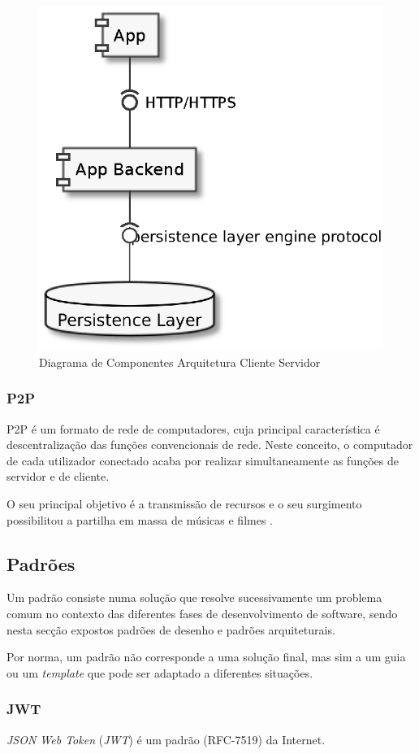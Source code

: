 \begin{figure}[H]
    \begin{center}
    \includegraphics[width=0.5 \textwidth]{figures/actual_web.eps}
    \caption{Diagrama de Componentes Arquitetura Cliente Servidor}
    \end{center}
\end{figure}

\subsubsection{P2P \label{subsection:p2p}}
P2P é um formato de rede de computadores, cuja principal característica é descentralização das funções convencionais de rede. Neste conceito, o computador de cada utilizador conectado acaba por realizar simultaneamente as funções de servidor e de cliente\cite{what_are_P2P_networks}.

O seu principal objetivo é a transmissão de recursos e o seu surgimento possibilitou a partilha em massa de músicas e filmes \cite{what_are_P2P_networks}.

\subsection{Padrões}
Um padrão consiste numa solução que resolve sucessivamente um problema comum no contexto das diferentes fases de desenvolvimento de software, sendo nesta secção expostos padrões de desenho e padrões arquiteturais. 

Por norma, um padrão não corresponde a uma solução final, mas sim a um guia ou um \emph{template} que pode ser adaptado a diferentes situações\cite{clean_architecture}.

\subsubsection{JWT \label{subsection:jwt}}
\emph{JSON Web Token} (\emph{JWT\label{sym:jwt}}) é um padrão (RFC-7519) da Internet.

